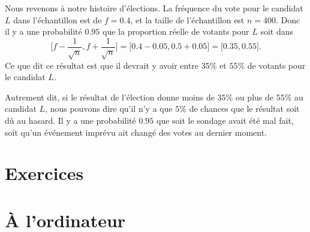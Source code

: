 Nous revenons à notre histoire d'élections. La fréquence du vote pour le candidat \( L\) dans l'échantillon est de \( f=0.4\), et la taille de l'échantillon est \( n=400\). Donc il y a une probabilité \( 0.95\) que la proportion réelle de votants pour \( L\) soit dans
\begin{equation}
    \mathopen[ f-\frac{1}{ \sqrt{n} } , f+\frac{1}{ \sqrt{n} } \mathclose]=\mathopen[ 0.4-0.05 , 0.5+0.05 \mathclose]=\mathopen[ 0.35 , 0.55 \mathclose].
\end{equation}
Ce que dit ce résultat est que il devrait y avoir entre \( 35\%\) et \( 55\%\) de votants pour le candidat \( L\).

Autrement dit, si le résultat de l'élection donne moins de \( 35\%\) ou plus de \( 55\%\) au candidat \( L\), nous pouvons dire qu'il n'y a que \( 5\%\) de chances que le résultat soit dû au hasard. Il y a une probabilité \( 0.95\) que soit le sondage avait été mal fait, soit qu'un événement imprévu ait changé des votes au dernier moment.

\section{Exercices}


\section{À l'ordinateur}



